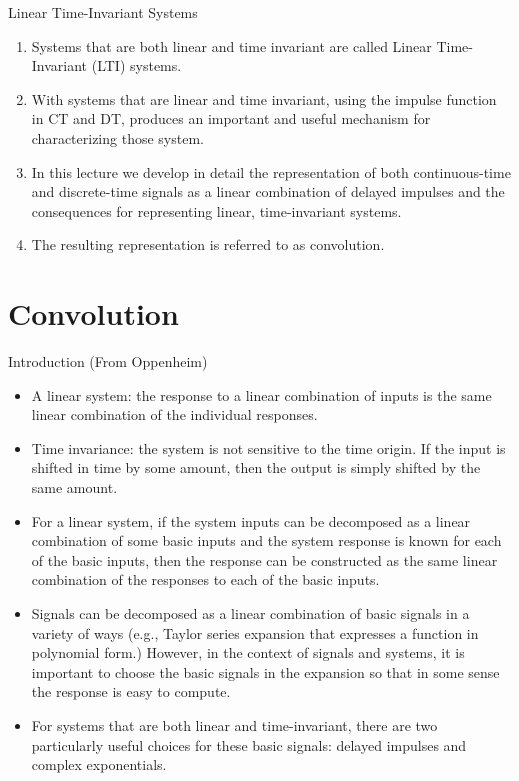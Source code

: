\begin{frame}{Linear Time-Invariant Systems}
    \begin{enumerate}
        \item Systems that are both linear and time invariant are called Linear Time-Invariant (LTI) systems.
        \item With systems that are linear and time invariant, using the impulse function in CT and DT, produces an important and useful mechanism for characterizing those system.
        \item In this lecture we develop in detail the representation of both continuous-time and discrete-time signals as a linear combination of delayed impulses and the consequences for representing linear, time-invariant systems.
        \item The resulting representation is referred to as convolution.
    \end{enumerate}
\end{frame}


\section{Convolution}

\begin{frame}{Introduction (From Oppenheim)}
    \begin{itemize}
        \item A linear system: the response to a linear combination of inputs is the same linear combination of the individual responses.
        \item Time invariance: the system is not sensitive to the time origin. If the input is shifted in time by some amount, then the output is simply shifted by the same amount.
        \item For a linear system, if the system inputs can be decomposed as a linear combination of some basic inputs and the system response is known for each of the basic inputs, then the response can be constructed as the same linear combination of the responses to each of the basic inputs.
        \item Signals can be decomposed as a linear combination of basic signals in a variety of ways (e.g., Taylor series expansion that expresses a function in polynomial form.) However, in the context of signals and systems, it is important to choose the basic signals in the expansion so that in some sense the response is easy to compute.
        \item For systems that are both linear and time-invariant, there are two particularly useful choices for these basic signals: delayed impulses and complex exponentials.
    \end{itemize}
\end{frame}

